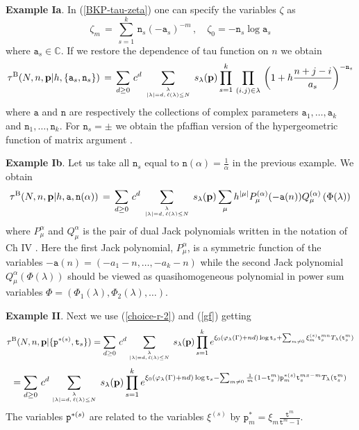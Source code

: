 \documentclass[a4paper,10pt]{article}
\newcommand{\bpow}{\mathbf{p}}
\theoremstyle{plain}
\theoremstyle{remark}
\def\be{\begin{equation}}
\def\ee{\end{equation}}
\begin{document}
{\bf Example Ia}. In (\ref{BKP-tau-zeta}) one can specify the variables $\zeta$ as
\[
 \zeta_m\,=\,\sum_{s=1}^k\,\texttt{n}_s (-\texttt{a}_s)^{-m}\,,\quad \zeta_0=-\texttt{n}_s\log \texttt{a}_s
\]
where $\texttt{a}_s\in\mathbb{C}$.
If we restore the dependence of tau function on $n$ we obtain
\be\label{BKP-Pochhammer-texttt-a}
\tau^{\rm B}(N,n,\bpow|h,\{ \texttt{a}_s,\texttt{n}_s \})\,=\,\sum_{d\ge 0}\, c^d
\,\sum_{\lambda\atop |\lambda|=d,\, \ell(\lambda)\le N}\,s_\lambda(\bpow) \prod_{s=1}^k \,\prod_{(i.j)\in\lambda}\,
\left(1+h\frac{n+j-i}{a_s} \right)^{-\texttt{n}_s}
\ee
where $\texttt{a}$ and $\texttt{n}$ are respectively the collections of complex parameters
$\texttt{a}_1,\dots,\texttt{a}_k$ and $\texttt{n}_1,\dots,\texttt{n}_k$. For $\texttt{n}_s=\pm$ we obtain the
pfaffian version of the hypergeometric function of matrix argument \cite{OS-TMP}.


{\bf Example Ib}. Let us take all $\texttt{n}_s$ equal to $\texttt{n}(\alpha)=\frac{1}{\alpha}$ in the previous example. We obtain
\be\label{BKP-Pochhammer-Jack}
\tau^{\rm B}(N,n,\bpow|h,\texttt{a},\texttt{n}(\alpha))\,=\,\sum_{d\ge 0}\, c^d
\,\sum_{\lambda\atop |\lambda|=d,\, \ell(\lambda)\le N}\,s_\lambda(\bpow) \sum_{\mu} h^{|\mu|}
P_\mu^{(\alpha)}(-\texttt{a}(n))Q_\mu^{(\alpha)}\left(\Phi(\lambda)\right)
\ee
where $P_\mu^{\alpha}$ and $Q_\mu^{\alpha}$ is the pair of dual Jack polynomials written in  the notation of Ch IV \cite{Mac}.
Here the first Jack polynomial, $P_\mu^{\alpha}$, is a
symmetric function of the variables
$-\texttt{a}(n) = (-a_1-n,\dots,-a_k-n)$ while the second Jack polynomial $Q_\mu^{\alpha}\left(\Phi(\lambda)\right)$ should be viewed as
 quasihomogeneous polynomial in power sum variables $\Phi=(\Phi_1(\lambda),\Phi_2(\lambda),\dots)$.



{\bf Example II}. Next we use (\ref{choice-r-2}) and (\ref{gf}) getting
\be\label{BKP-tau-Okounkov-AMMN-q-i}
\tau^{\rm B}(N,n,\bpow|\{{\bf \texttt{p}}^{*(s)},\texttt{t}_s\})=
\sum_{d\ge 0}\, c^d\sum_{\lambda\atop |\lambda|=d,\, \ell(\lambda)\le N}\,s_\lambda(\bpow)\prod_{s=1}^k
e^{\xi_0 (\varphi_\lambda(\Gamma)+nd)\log \texttt{t}_{s}+\sum_{m\neq 0} \xi_m^{(s)} \texttt{t}_s^{mn}
T_\lambda(\texttt{t}_s^m) }
\ee
\be
\label{BKP-tau-Okounkov-AMMN-q-i-t^*}
=\sum_{d\ge 0}\, c^d\sum_{\lambda\atop |\lambda|=d,\, \ell(\lambda)\le N}\,s_\lambda(\bpow)\prod_{s=1}^k
e^{\xi_0 (\varphi_\lambda(\Gamma)+nd)\log\texttt{t}_s - \sum_{m\neq 0} \frac 1m (1-\texttt{t}_s^{m}) \texttt{p}^{*(s)}_m
\texttt{t}_s^{mx-m} T_\lambda(\texttt{t}_s^m)}
\ee
 The variables ${\bf\texttt{p}}^{*(s)}$ are
related to the variables $\xi^{(s)}$ by $\texttt{p}^*_m=\xi_m\frac{\texttt{t}^m}{\texttt{t}^m-1}$.
\end{document}
